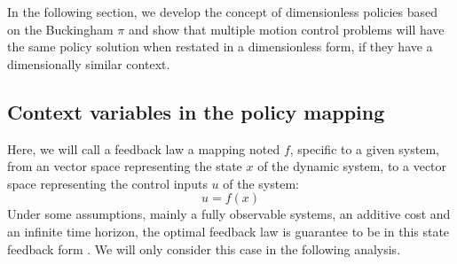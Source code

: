 In the following section, we develop the concept of dimensionless policies based on the Buckingham $\pi$ and show that multiple motion control problems will have the same policy solution when restated in a dimensionless form, if they have a dimensionally similar context.

\subsection{Context variables in the policy mapping}

Here, we will call a feedback law a mapping noted $f$, specific to a given system, from an vector space representing the state $x$ of the dynamic system, to a vector space representing the control inputs $u$ of the system:
\begin{equation}
u
=
f \left(
x
\right)
\end{equation}
Under some assumptions, mainly a fully observable systems, an additive cost and an infinite time horizon, the optimal feedback law is guarantee to be in this state feedback form \cite{bertsekas_dynamic_2012}. We will only consider this case in the following analysis.

